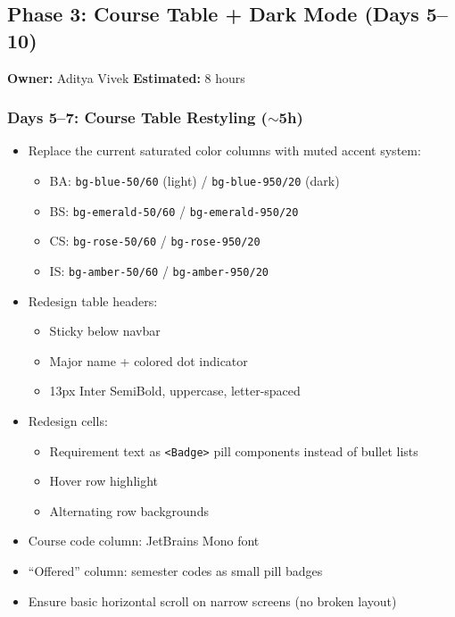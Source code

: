 \documentclass[11pt]{article}
\begin{document}
\subsection{Phase 3: Course Table + Dark Mode (Days 5--10)}

\textbf{Owner:} Aditya Vivek \hfill \textbf{Estimated:} 8 hours

\subsubsection{Days 5--7: Course Table Restyling ($\sim$5h)}

\begin{itemize}[leftmargin=2em]
    \item Replace the current saturated color columns with muted accent system:
    \begin{itemize}
        \item BA: \texttt{bg-blue-50/60} (light) / \texttt{bg-blue-950/20} (dark)
        \item BS: \texttt{bg-emerald-50/60} / \texttt{bg-emerald-950/20}
        \item CS: \texttt{bg-rose-50/60} / \texttt{bg-rose-950/20}
        \item IS: \texttt{bg-amber-50/60} / \texttt{bg-amber-950/20}
    \end{itemize}
    \item Redesign table headers:
    \begin{itemize}
        \item Sticky below navbar
        \item Major name + colored dot indicator
        \item 13px Inter SemiBold, uppercase, letter-spaced
    \end{itemize}
    \item Redesign cells:
    \begin{itemize}
        \item Requirement text as \texttt{<Badge>} pill components instead of bullet lists
        \item Hover row highlight
        \item Alternating row backgrounds
    \end{itemize}
    \item Course code column: JetBrains Mono font
    \item ``Offered'' column: semester codes as small pill badges
    \item Ensure basic horizontal scroll on narrow screens (no broken layout)
\end{itemize}
\end{document}
